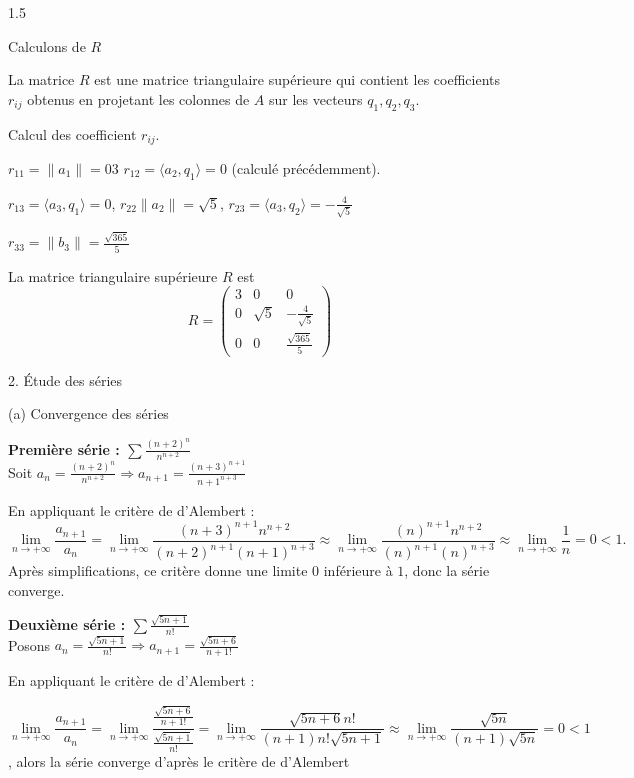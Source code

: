 \documentclass[12pt]{article}
\begin{document}
\begin{spacing}{1.5}
\quad

Calculons de $R$

La matrice $R$ est une matrice triangulaire supérieure qui contient les coefficients $r_{ij}$ obtenus en projetant  les colonnes de $A$ sur les vecteurs $q_1,q_2,q_3$.

Calcul des coefficient $r_{ij}$.

$r_{11}=\parallel a_1\parallel=03$ \quad   $r_{12}=\langle a_2,q_1\rangle=0$ (calculé précédemment).


$r_{13}=\langle a_3,q_1\rangle =0$, \quad $r_{22}\parallel a_2\parallel=\sqrt{5}$, \quad $r_{23}=\langle a_3,q_2\rangle=-\frac{4}{\sqrt{5}}$

$r_{33}=\parallel b_3\parallel=\frac{\sqrt{365}}{5}$

La matrice triangulaire supérieure $R$ est \[R=\begin{pmatrix}
3 & 0 & 0 \\ 
0 & \sqrt{5} & -\frac{4}{\sqrt{5}} \\ 
0 & 0 & \frac{\sqrt{365}}{5}
\end{pmatrix} \]




2. Étude des séries

(a) Convergence des séries

\textbf{Première série : $\sum \frac{(n+2)^n}{n^{n+2}}$} \\

Soit $a_n=\frac{(n+2)^n}{n^{n+2}}\Longrightarrow a_{n+1}=\frac{(n+3)^{n+1}}{{n+1}^{n+3}}$

En appliquant le critère de d'Alembert :
\[
\lim_{n \to +\infty} \frac{a_{n+1}}{a_n} = \lim_{n \to +\infty} \frac{(n+3)^{n+1} n^{n+2}}{(n+2)^{n+1} (n+1)^{n+3}}\approx \lim_{n \to +\infty} \frac{(n)^{n+1} n^{n+2}}{(n)^{n+1} (n)^{n+3}}\approx \lim_{n \to +\infty} \frac{1}{n}=0<1.
\]
Après simplifications, ce critère donne une limite 0 inférieure à $1$, donc la série converge.

\textbf{Deuxième série : $\sum \frac{\sqrt{5n+1}}{n!}$} \\

Posons $a_n=\frac{\sqrt{5n+1}}{n!}\Rightarrow a_{n+1}=\frac{\sqrt{5n+6}}{{n+1}!}$

En appliquant le critère de d'Alembert :

\[
\lim_{n \to +\infty} \frac{a_{n+1}}{a_n} = \lim_{n \to +\infty} \frac{\frac{\sqrt{5n+6}}{{n+1}!}}{\frac{\sqrt{5n+1}}{n!}}=\lim_{n \to +\infty}\frac{\sqrt{5n+6}n!}{(n+1)n!\sqrt{5n+1}}\approx\lim_{n \to +\infty}\frac{\sqrt{5n}}{(n+1)\sqrt{5n}}=0<1\], alors la série converge d'après le critère de d'Alembert


\end{spacing}
\end{document}
